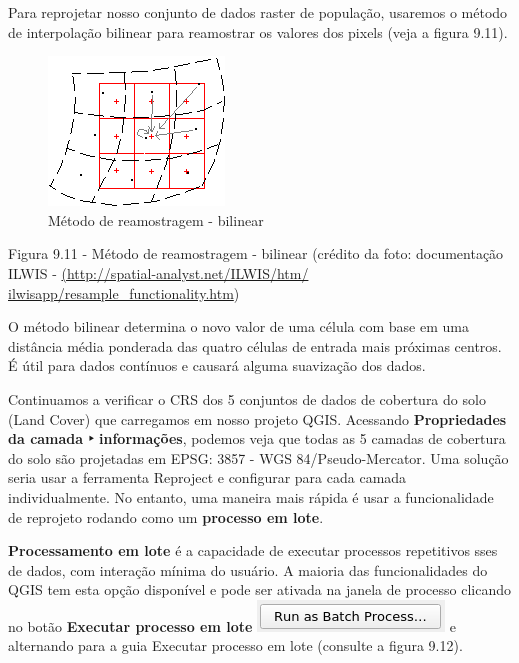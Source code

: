 \documentclass[
]{book}
\begin{document}
Para reprojetar nosso conjunto de dados raster de população, usaremos o método de interpolação bilinear para reamostrar os valores dos pixels (veja a figura 9.11).

\begin{figure}
\centering
\includegraphics{media/modulo9/fig911.png}
\caption{Método de reamostragem - bilinear}
\end{figure}

Figura 9.11 - Método de reamostragem - bilinear (crédito da foto: documentação ILWIS - \href{http://spatial-analyst.net/ILWIS/htm/ilwisapp/resample_functionality.htm}{(http://spatial-analyst.net/ILWIS/htm/ ilwisapp/resample\_functionality.htm})

O método bilinear determina o novo valor de uma célula com base em uma distância média ponderada das quatro células de entrada mais próximas centros. É útil para dados contínuos e causará alguma suavização dos dados.

Continuamos a verificar o CRS dos 5 conjuntos de dados de cobertura do solo (Land Cover) que carregamos em nosso projeto QGIS. Acessando \textbf{Propriedades da camada ‣ informações}, podemos veja que todas as 5 camadas de cobertura do solo são projetadas em EPSG: 3857 - WGS 84/Pseudo-Mercator. Uma solução seria usar a ferramenta Reproject e configurar para cada camada individualmente. No entanto, uma maneira mais rápida é usar a funcionalidade de reprojeto rodando como um \textbf{processo em lote}.

\textbf{Processamento em lote} é a capacidade de executar processos repetitivos sses de dados, com interação mínima do usuário. A maioria das funcionalidades do QGIS tem esta opção disponível e pode ser ativada na janela de processo clicando no botão \textbf{Executar processo em lote} \includegraphics{media/modulo9/batch-btn.png} e alternando para a guia Executar processo em lote (consulte a figura 9.12).
\end{document}
